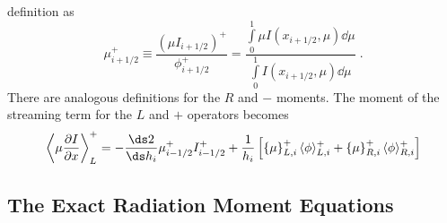 definition as
\begin{equation}\label{eq:ang_cons_face}
    {\mu}_{i+1/2}^{+} \equiv \frac{\left(\mu I_{i+ 1/2}\right)^+}{\phi_{i+1/2}^+}=  \frac{
        {\displaystyle \int\limits_0^1 \mu I(x_{i+1/2},\mu) \dd \mu }} 
        {{\displaystyle \int\limits_0^1 I(x_{i+1/2},\mu) \dd \mu }} \;.
\end{equation}
There are analogous definitions for the $R$ and $-$ moments.
The moment of the streaming
term for the $L$ and $+$ operators becomes
\begin{equation}\label{eq:stream_mom}
        {\displaystyle \left \langle \mu \pderiv{I}{x} \right \rangle_L^+ } = 
        -\frac{\ds2}{\ds h_i} \mu_{i-1/2}^+ I_{i-1/2}^+ + \frac{1}{h_i}\left[
        \cur{\mu}_{L,i}^+ \mom{\phi}^+_{L,i} + \cur{\mu}_{R,i}^+ \mom{\phi}_{R,i}^+
    \right]
\end{equation}


\subsection{The Exact Radiation Moment Equations}

